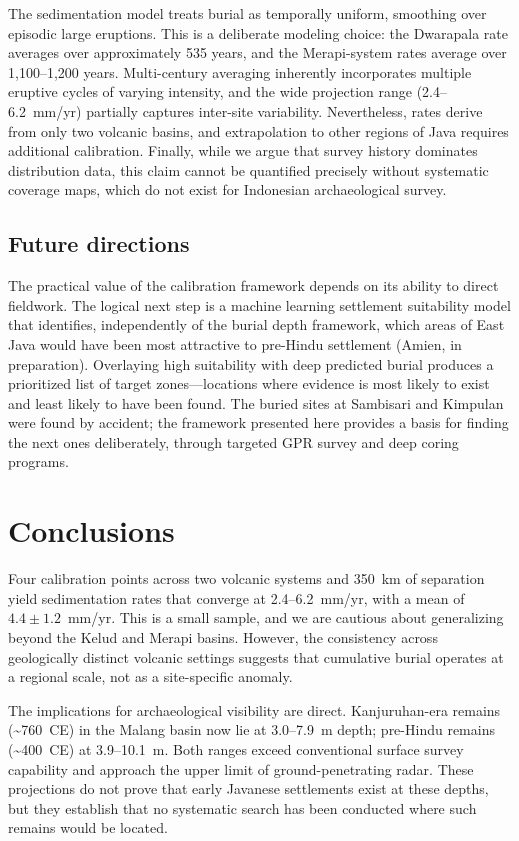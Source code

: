 \documentclass[12pt,a4paper]{article}
\begin{document}
The sedimentation model treats burial as temporally uniform, smoothing over episodic large eruptions. This is a deliberate modeling choice: the Dwarapala rate averages over approximately 535 years, and the Merapi-system rates average over 1,100--1,200 years. Multi-century averaging inherently incorporates multiple eruptive cycles of varying intensity, and the wide projection range (2.4--6.2~mm/yr) partially captures inter-site variability. Nevertheless, rates derive from only two volcanic basins, and extrapolation to other regions of Java requires additional calibration. Finally, while we argue that survey history dominates distribution data, this claim cannot be quantified precisely without systematic coverage maps, which do not exist for Indonesian archaeological survey.

\subsection{Future directions}

The practical value of the calibration framework depends on its ability to direct fieldwork. The logical next step is a machine learning settlement suitability model that identifies, independently of the burial depth framework, which areas of East Java would have been most attractive to pre-Hindu settlement (Amien, in preparation). Overlaying high suitability with deep predicted burial produces a prioritized list of target zones---locations where evidence is most likely to exist and least likely to have been found. The buried sites at Sambisari and Kimpulan were found by accident; the framework presented here provides a basis for finding the next ones deliberately, through targeted GPR survey and deep coring programs.


\section{Conclusions}

Four calibration points across two volcanic systems and 350~km of separation yield sedimentation rates that converge at 2.4--6.2~mm/yr, with a mean of $4.4 \pm 1.2$~mm/yr. This is a small sample, and we are cautious about generalizing beyond the Kelud and Merapi basins. However, the consistency across geologically distinct volcanic settings suggests that cumulative burial operates at a regional scale, not as a site-specific anomaly.

The implications for archaeological visibility are direct. Kanjuruhan-era remains (\textasciitilde760~CE) in the Malang basin now lie at 3.0--7.9~m depth; pre-Hindu remains (\textasciitilde400~CE) at 3.9--10.1~m. Both ranges exceed conventional surface survey capability and approach the upper limit of ground-penetrating radar. These projections do not prove that early Javanese settlements exist at these depths, but they establish that no systematic search has been conducted where such remains would be located.
\end{document}
